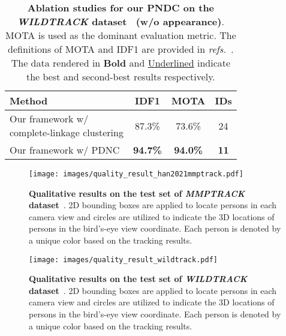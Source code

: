 \documentclass{CVM}
\begin{document}
\begin{table}[!h]
	\centering
	\setlength{\tabcolsep}{2pt}
	\footnotesize
	\caption{\textbf{Ablation studies for our PNDC on the \textit{WILDTRACK} dataset~\cite{chavdarova2018wildtrack} (w/o appearance)}. MOTA is used as the dominant evaluation metric. The definitions of MOTA and IDF1 are provided in \textit{refs.}~\cite{MOTChallenge2015,milan2016mot16}. The data rendered in \textbf{Bold} and \underline{Underlined} indicate the best and second-best results respectively. }
	\label{tab:multi-wildtrack_ablation}
	\begin{tabular}{lccc}
  \toprule
	Method  & IDF1  & MOTA   & IDs  \\ 
	\midrule
	\makecell[l]{Our framework w/ \\complete-linkage clustering} & 87.3\%  & 73.6\%  & 24 \\  \midrule
	Our framework w/ PDNC  & \textbf{94.7\%}  & \textbf{94.0\%} & \textbf{11}  \\ 
	\bottomrule
	\end{tabular}
  \end{table}



  \begin{figure*}[!h]
    \centering
    \texttt{[image: images/quality\_result\_han2021mmptrack.pdf]}
    \caption{\textbf{Qualitative results on the test set of \textit{MMPTRACK} dataset}~\cite{han2021mmptrack}. 2D bounding boxes are applied to locate persons in each camera view and circles are utilized to indicate the 3D locations of persons in the bird’s-eye view coordinate. Each person is denoted by a unique color based on the tracking results.}\label{fig:results_MMPTRACK}
  \end{figure*}
  
  
  \begin{figure*}[!h]
    \centering
    \texttt{[image: images/quality\_result\_wildtrack.pdf]}
    \caption{\textbf{Qualitative results on the test set of \textit{WILDTRACK} dataset}~\cite{chavdarova2018wildtrack}. 2D bounding boxes are applied to locate persons in each camera view and circles are utilized to indicate the 3D locations of persons in the bird’s-eye view coordinate. Each person is denoted by a unique color based on the tracking results.}\label{fig:results_WILDTRACK}
  \end{figure*}
\end{document}
